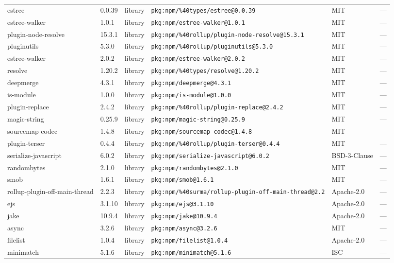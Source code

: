 \documentclass[11pt]{article}
\begin{document}
\begin{longtable}{|l|l|l|p{2.2cm}|l|p{4cm}|}
estree & 0.0.39 & library & \texttt{pkg:npm/\%40types/estree@0.0.39} & MIT & — \\
estree-walker & 1.0.1 & library & \texttt{pkg:npm/estree-walker@1.0.1} & MIT & — \\
plugin-node-resolve & 15.3.1 & library & \texttt{pkg:npm/\%40rollup/plugin-node-resolve@15.3.1} & MIT & — \\
pluginutils & 5.3.0 & library & \texttt{pkg:npm/\%40rollup/pluginutils@5.3.0} & MIT & — \\
estree-walker & 2.0.2 & library & \texttt{pkg:npm/estree-walker@2.0.2} & MIT & — \\
resolve & 1.20.2 & library & \texttt{pkg:npm/\%40types/resolve@1.20.2} & MIT & — \\
deepmerge & 4.3.1 & library & \texttt{pkg:npm/deepmerge@4.3.1} & MIT & — \\
is-module & 1.0.0 & library & \texttt{pkg:npm/is-module@1.0.0} & MIT & — \\
plugin-replace & 2.4.2 & library & \texttt{pkg:npm/\%40rollup/plugin-replace@2.4.2} & MIT & — \\
magic-string & 0.25.9 & library & \texttt{pkg:npm/magic-string@0.25.9} & MIT & — \\
sourcemap-codec & 1.4.8 & library & \texttt{pkg:npm/sourcemap-codec@1.4.8} & MIT & — \\
plugin-terser & 0.4.4 & library & \texttt{pkg:npm/\%40rollup/plugin-terser@0.4.4} & MIT & — \\
serialize-javascript & 6.0.2 & library & \texttt{pkg:npm/serialize-javascript@6.0.2} & BSD-3-Clause & — \\
randombytes & 2.1.0 & library & \texttt{pkg:npm/randombytes@2.1.0} & MIT & — \\
smob & 1.6.1 & library & \texttt{pkg:npm/smob@1.6.1} & MIT & — \\
rollup-plugin-off-main-thread & 2.2.3 & library & \texttt{pkg:npm/\%40surma/rollup-plugin-off-main-thread@2.2} & Apache-2.0 & — \\
ejs & 3.1.10 & library & \texttt{pkg:npm/ejs@3.1.10} & Apache-2.0 & — \\
jake & 10.9.4 & library & \texttt{pkg:npm/jake@10.9.4} & Apache-2.0 & — \\
async & 3.2.6 & library & \texttt{pkg:npm/async@3.2.6} & MIT & — \\
filelist & 1.0.4 & library & \texttt{pkg:npm/filelist@1.0.4} & Apache-2.0 & — \\
minimatch & 5.1.6 & library & \texttt{pkg:npm/minimatch@5.1.6} & ISC & — \\

\end{longtable}
\end{document}
